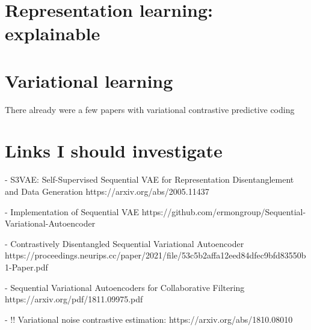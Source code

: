 \section{Representation learning: explainable}
\section{Variational learning}
There already were a few papers with variational contrastive predictive coding

\section{Links I should investigate}
- S3VAE: Self-Supervised Sequential VAE for Representation Disentanglement and Data Generation
https://arxiv.org/abs/2005.11437

- Implementation of Sequential VAE
https://github.com/ermongroup/Sequential-Variational-Autoencoder

- Contrastively Disentangled Sequential Variational Autoencoder
https://proceedings.neurips.cc/paper/2021/file/53c5b2affa12eed84dfec9bfd83550b1-Paper.pdf

- Sequential Variational Autoencoders for Collaborative Filtering
https://arxiv.org/pdf/1811.09975.pdf

- !! Variational noise contrastive estimation:
https://arxiv.org/abs/1810.08010